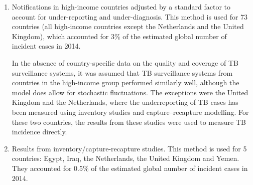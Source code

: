 \begin{enumerate}
\item {Notifications in high-income countries adjusted by a standard factor to account for under-reporting and under-diagnosis.} This method is used for 73 countries (all high-income countries except the Netherlands and the United Kingdom), which accounted for 3\% of the estimated global number of incident cases in 2014.

In the absence of country-specific data on the quality and coverage of TB surveillance systems, it was assumed that TB surveillance systems from countries in the high-income group performed similarly well, although the model does allow for stochastic fluctuations. The exceptions were the United Kingdom and the Netherlands, where the underreporting of TB cases has been measured using inventory studies and capture–recapture modelling\cite{Anderson2010}\cite{17156496}. For these two countries, the results from these studies were used to measure TB incidence directly.


\item {Results from inventory/capture-recapture studies.} This method is used for 5 countries: Egypt, Iraq, the Netherlands, the United Kingdom and Yemen. They accounted for 0.5\% of the estimated global number of incident cases in 2014. 
\end{enumerate}




  
  
  
  
  
  
  
  
  
  